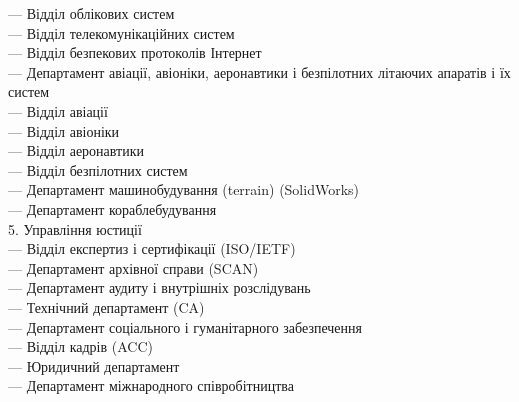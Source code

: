 \hspace*{0.7cm}         — Відділ облікових систем \\
\hspace*{0.7cm}         — Відділ телекомунікаційних систем \\
\hspace*{0.7cm}         — Відділ безпекових протоколів Інтернет \\
\hspace*{0.25cm}     — Департамент авіації, авіоніки, аеронавтики і безпілотних літаючих апаратів і їх систем\\
\hspace*{0.7cm}         — Відділ авіації \\
\hspace*{0.7cm}         — Відділ авіоніки \\
\hspace*{0.7cm}         — Відділ аеронавтики \\
\hspace*{0.7cm}         — Відділ безпілотних систем \\
\hspace*{0.25cm}     — Департамент машинобудування (terrain) (SolidWorks) \\
\hspace*{0.25cm}     — Департамент кораблебудування \\
5. Управління юстиції \\
\hspace*{0.25cm}     — Відділ експертиз і сертифікації (ISO/IETF) \\
\hspace*{0.25cm}     — Департамент архівної справи (SCAN) \\
\hspace*{0.25cm}     — Департамент аудиту і внутрішніх розслідувань \\
\hspace*{0.25cm}     — Технічний департамент (CA) \\
\hspace*{0.25cm}     — Департамент соціального і гуманітарного забезпечення \\
\hspace*{0.25cm}     — Відділ кадрів (ACC) \\
\hspace*{0.25cm}     — Юридичний департамент \\
\hspace*{0.25cm}     — Департамент міжнародного співробітництва \\
